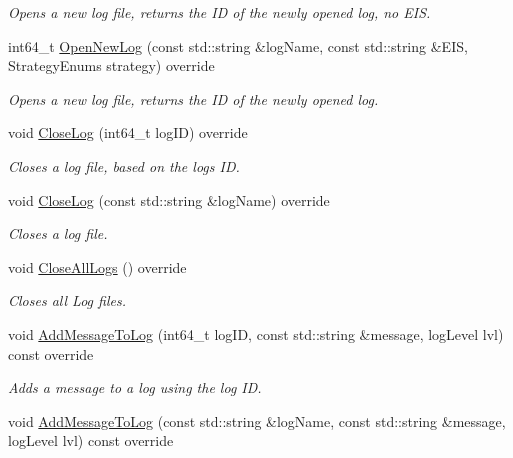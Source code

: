 \begin{DoxyCompactItemize}
\begin{DoxyCompactList}\small\item\em Opens a new log file, returns the ID of the newly opened log, no E\+IS. \end{DoxyCompactList}\item 
int64\+\_\+t \mbox{\hyperlink{classLoggerClasses_1_1LogHandler_afeb4c6f0786cb9ae1d0488955d72aa4b}{Open\+New\+Log}} (const std\+::string \&log\+Name, const std\+::string \&E\+IS, Strategy\+Enums strategy) override
\begin{DoxyCompactList}\small\item\em Opens a new log file, returns the ID of the newly opened log. \end{DoxyCompactList}\item 
void \mbox{\hyperlink{classLoggerClasses_1_1LogHandler_a23f7c4a588bc16e6432ae59071f5d847}{Close\+Log}} (int64\+\_\+t log\+ID) override
\begin{DoxyCompactList}\small\item\em Closes a log file, based on the logs ID. \end{DoxyCompactList}\item 
void \mbox{\hyperlink{classLoggerClasses_1_1LogHandler_aa05e0b9ca6afa0ca634ba4404ca29d3d}{Close\+Log}} (const std\+::string \&log\+Name) override
\begin{DoxyCompactList}\small\item\em Closes a log file. \end{DoxyCompactList}\item 
void \mbox{\hyperlink{classLoggerClasses_1_1LogHandler_a38dcaa7d1bcbfdd9b05483ea86657e6b}{Close\+All\+Logs}} () override
\begin{DoxyCompactList}\small\item\em Closes all Log files. \end{DoxyCompactList}\item 
void \mbox{\hyperlink{classLoggerClasses_1_1LogHandler_ada6d788e50a7902ac81fba8b3344392a}{Add\+Message\+To\+Log}} (int64\+\_\+t log\+ID, const std\+::string \&message, log\+Level lvl) const override
\begin{DoxyCompactList}\small\item\em Adds a message to a log using the log ID. \end{DoxyCompactList}\item 
void \mbox{\hyperlink{classLoggerClasses_1_1LogHandler_a2bba7cc390106f65d5d1c8147301faa3}{Add\+Message\+To\+Log}} (const std\+::string \&log\+Name, const std\+::string \&message, log\+Level lvl) const override

\end{DoxyCompactItemize}
